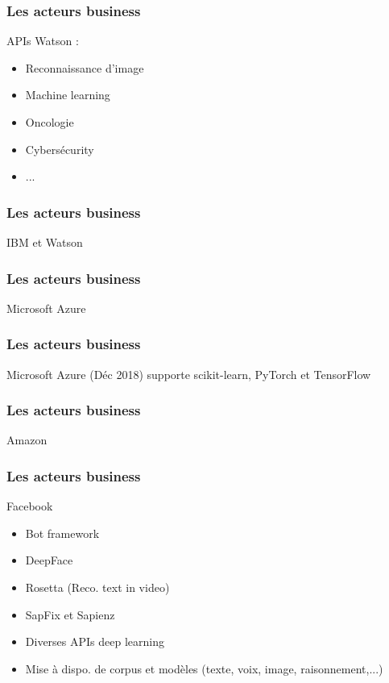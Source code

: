 \begin{frame}
  \frametitle{Les acteurs business}
  APIs Watson :
  \begin{itemize}
  \item Reconnaissance d'image
  \item Machine learning
  \item Oncologie
  \item Cybersécurity
  \item ...
  \end{itemize}
\end{frame}

\begin{frame}
  \frametitle{Les acteurs business}
  IBM et Watson
\end{frame}

\begin{frame}
  \frametitle{Les acteurs business}
  Microsoft Azure
\end{frame}

\begin{frame}
  \frametitle{Les acteurs business}
  Microsoft Azure
  \newline
  (Déc 2018) supporte scikit-learn, PyTorch et TensorFlow
\end{frame}

\begin{frame}
  \frametitle{Les acteurs business}
  Amazon
\end{frame}

\begin{frame}
  \frametitle{Les acteurs business}
  Facebook
  \begin{itemize}
  \item Bot framework
  \item DeepFace
  \item Rosetta (Reco. text in video)
  \item SapFix et Sapienz 
  \item Diverses APIs deep learning
  \item Mise à dispo. de corpus et modèles (texte, voix, image, raisonnement,...)
  \end{itemize}
\end{frame}


